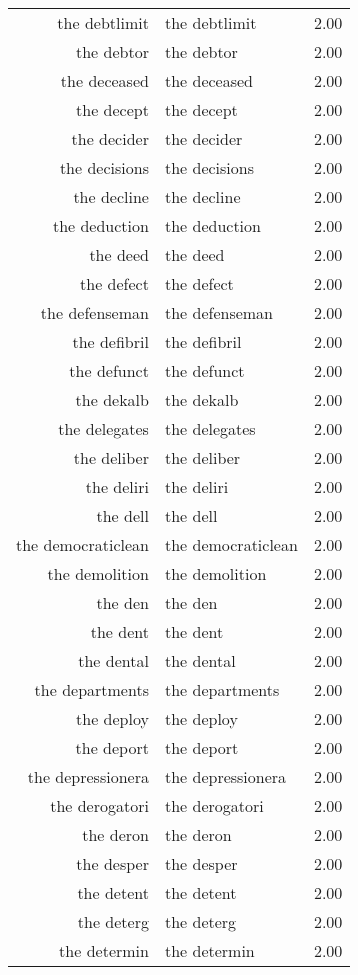 \begin{table}[ht]
\begin{tabular}{rlr}
  the debtlimit & the debtlimit & 2.00 \\ 
  the debtor & the debtor & 2.00 \\ 
  the deceased & the deceased & 2.00 \\ 
  the decept & the decept & 2.00 \\ 
  the decider & the decider & 2.00 \\ 
  the decisions & the decisions & 2.00 \\ 
  the decline & the decline & 2.00 \\ 
  the deduction & the deduction & 2.00 \\ 
  the deed & the deed & 2.00 \\ 
  the defect & the defect & 2.00 \\ 
  the defenseman & the defenseman & 2.00 \\ 
  the defibril & the defibril & 2.00 \\ 
  the defunct & the defunct & 2.00 \\ 
  the dekalb & the dekalb & 2.00 \\ 
  the delegates & the delegates & 2.00 \\ 
  the deliber & the deliber & 2.00 \\ 
  the deliri & the deliri & 2.00 \\ 
  the dell & the dell & 2.00 \\ 
  the democraticlean & the democraticlean & 2.00 \\ 
  the demolition & the demolition & 2.00 \\ 
  the den & the den & 2.00 \\ 
  the dent & the dent & 2.00 \\ 
  the dental & the dental & 2.00 \\ 
  the departments & the departments & 2.00 \\ 
  the deploy & the deploy & 2.00 \\ 
  the deport & the deport & 2.00 \\ 
  the depressionera & the depressionera & 2.00 \\ 
  the derogatori & the derogatori & 2.00 \\ 
  the deron & the deron & 2.00 \\ 
  the desper & the desper & 2.00 \\ 
  the detent & the detent & 2.00 \\ 
  the deterg & the deterg & 2.00 \\ 
  the determin & the determin & 2.00 \\ 

\end{tabular}
\end{table}
